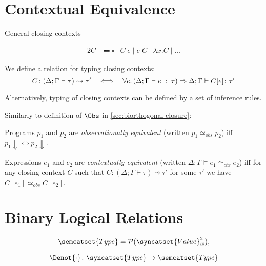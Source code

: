 \section{Contextual Equivalence}

General closing contexts

\begin{alignat*}{2}
  C & \Coloneqq \square \mid C\;e \mid e\;C \mid \lambda x.C \mid \ldots
\end{alignat*}

We define a relation for typing closing contexts:
\[
  C \colon (\Delta; \Gamma \vdash \tau) \leadsto \tau'
    \quad\Longleftrightarrow\quad
    \forall e\ldotp (\Delta; \Gamma \vdash e \;:\;\tau) \Rightarrow
      \Delta;\Gamma \vdash C[e] \colon \tau'
\]

Alternatively, typing of closing contexts can be defined by
a set of inference rules.

Similarly to definition of $\Obs$ in \autoref{sec:biorthogonal-closure}:

\begin{defin}
  Programs $p_1$ and $p_2$ are \emph{observationally equivalent}
  (written $p_1 \simeq_{obs} p_2$)
  iff $p_1 \Downarrow \iff p_2 \Downarrow$.
\end{defin}

\begin{defin}
  Expressions $e_1$ and $e_2$ are \emph{contextually equivalent}
  (written $\Delta; \Gamma \models e_1 \simeq_{ctx} e_2$)
  iff for any closing context $C$ such that $C : (\Delta;\Gamma\vdash\tau) \leadsto \tau'$
  for some $\tau'$
  we have $C[e_1] \simeq_{obs} C[e_2]$.
\end{defin}

\section{Binary Logical Relations}
\[
  \semcatset{Type} = \mathcal{P}(\syncatset{Value}_{\varnothing}^2),
\]

\[
  \Denot{\cdot} \colon \syncatset{Type} \to \semcatset{Type}
\]

